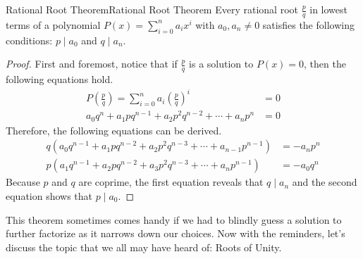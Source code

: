 \documentclass[../../main.tex]{subfiles}
\begin{document}
\begin{theorem}{Rational Root Theorem}{Rational Root Theorem}
Every rational root $\frac{p}{q}$ in lowest terms of a polynomial
$P(x) = \sum_{i=0}^n a_i x^i$ with $a_0, a_n \neq 0$ satisfies the
following conditions: $p \mid a_0$ and $q \mid a_n$.
\end{theorem}
\begin{proof}
First and foremost, notice that if $\frac{p}{q}$ is a solution to
$P(x) = 0$, then the following equations hold.
\begin{align*}
    P \left( \frac{p}{q} \right)
    = \sum_{i=0}^n a_i \left( \frac{p}{q} \right)^i
    &= 0 \\
    a_0 q^n + a_1 p q^{n-1} + a_2 p^2 q^{n-2} + \cdots + a_n p^n
    &= 0
\end{align*}
Therefore, the following equations can be derived.
\begin{align*}
    q \left( a_0 q^{n-1} + a_1 p q^{n-2} + a_2 p^2 q^{n-3} +
        \cdots + a_{n-1} p^{n-1}
    \right)
    &= -a_n p^n \\
    p \left( a_1 q^{n-1} + a_2 p q^{n-2} + a_3 p^2 q^{n-3} +
        \cdots + a_n p^{n - 1}
    \right)
    &= -a_0 q^n
\end{align*}
Because $p$ and $q$ are coprime, the first equation reveals that
$q \mid a_n$ and the second equation shows that $p \mid a_0$.
\end{proof}

This theorem sometimes comes handy if we had to blindly guess
a solution to further factorize as it narrows down our choices.
Now with the reminders, let's discuss the topic that we all may
have heard of: Roots of Unity.
\end{document}

